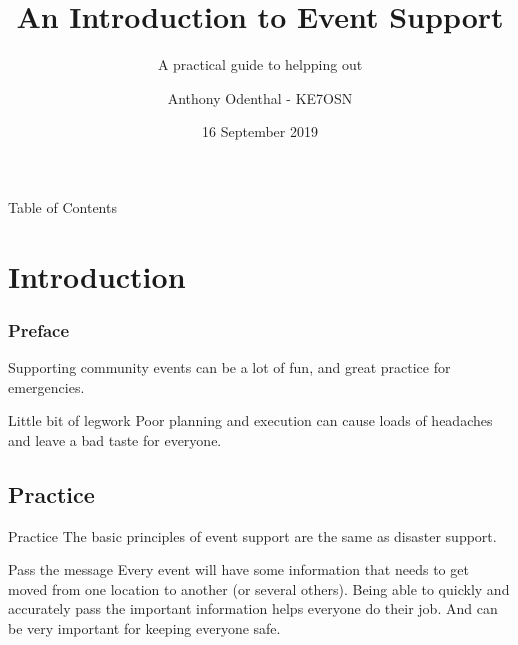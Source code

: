 \documentclass[11pt]{beamer}
\begin{document}
	\author{Anthony Odenthal - KE7OSN}
	\title{An Introduction to Event Support}
	\subtitle{A practical guide to helpping out}
	\date{16 September 2019}

\begin{frame}[plain]
	\maketitle
\end{frame}

\begin{frame}{Table of Contents}
\tableofcontents
\end{frame}

\section{Introduction}

\begin{frame}
\frametitle{Preface}
Supporting community events can be a lot of fun, and great practice for emergencies.
\end{frame}

\begin{frame}{Little bit of legwork}
Poor planning and execution can cause loads of headaches and leave a bad taste for everyone.
\end{frame}

\subsection{Practice}

\begin{frame}{Practice}
The basic principles of event support are the same as disaster support.
\end{frame}

\begin{frame}{Pass the message}
Every event will have some information that needs to get moved from one location to another (or several others). Being able to quickly and accurately pass the important information helps everyone do their job. And can be very important for keeping everyone safe.
\end{frame}
\end{document}
